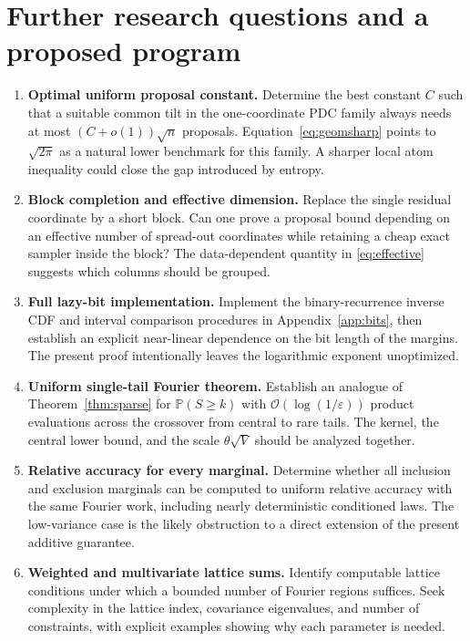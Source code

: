 \documentclass[11pt,a4paper]{article}
\theoremstyle{definition}
\newcommand{\Prob}{\mathbb P}
\newcommand{\BigO}{\mathcal O}
\begin{document}
\section{Further research questions and a proposed program}\label{sec:future}

\begin{enumerate}[label=\textbf{Q\arabic*.},leftmargin=3em]
\item \textbf{Optimal uniform proposal constant.} Determine the best constant $C$ such that a suitable common tilt in the one-coordinate PDC family always needs at most $(C+o(1))\sqrt n$ proposals. Equation~\eqref{eq:geomsharp} points to $\sqrt{2\pi}$ as a natural lower benchmark for this family. A sharper local atom inequality could close the gap introduced by entropy.

\item \textbf{Block completion and effective dimension.} Replace the single residual coordinate by a short block. Can one prove a proposal bound depending on an effective number of spread-out coordinates while retaining a cheap exact sampler inside the block? The data-dependent quantity in \eqref{eq:effective} suggests which columns should be grouped.

\item \textbf{Full lazy-bit implementation.} Implement the binary-recurrence inverse CDF and interval comparison procedures in Appendix~\ref{app:bits}, then establish an explicit near-linear dependence on the bit length of the margins. The present proof intentionally leaves the logarithmic exponent unoptimized.

\item \textbf{Uniform single-tail Fourier theorem.} Establish an analogue of Theorem~\ref{thm:sparse} for $\Prob(S\ge k)$ with $\BigO(\log(1/\varepsilon))$ product evaluations across the crossover from central to rare tails. The kernel, the central lower bound, and the scale $\theta\sqrt V$ should be analyzed together.

\item \textbf{Relative accuracy for every marginal.} Determine whether all inclusion and exclusion marginals can be computed to uniform relative accuracy with the same Fourier work, including nearly deterministic conditioned laws. The low-variance case is the likely obstruction to a direct extension of the present additive guarantee.

\item \textbf{Weighted and multivariate lattice sums.} Identify computable lattice conditions under which a bounded number of Fourier regions suffices. Seek complexity in the lattice index, covariance eigenvalues, and number of constraints, with explicit examples showing why each parameter is needed.


\end{enumerate}
\end{document}

